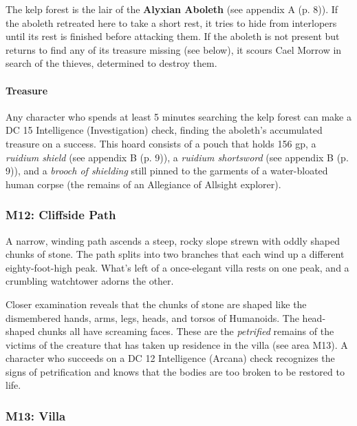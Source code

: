 \documentclass[a4paper, 11pt, bg=full, twocolumn, nooutline]{dndbook}
\begin{document}
The kelp forest is the lair of the \textbf{Alyxian Aboleth} (see appendix A (p. 8)). If the aboleth retreated here to take a short rest, it tries to hide from interlopers until its rest is finished before attacking them. If the aboleth is not present but returns to find any of its treasure missing (see below), it scours Cael Morrow in search of the thieves, determined to destroy them.

\paragraph{Treasure}

Any character who spends at least 5 minutes searching the kelp forest can make a DC 15 Intelligence (Investigation) check, finding the aboleth's accumulated treasure on a success. This hoard consists of a pouch that holds 156 gp, a \textit{ruidium shield} (see appendix B (p. 9)), a \textit{ruidium shortsword} (see appendix B (p. 9)), and a \textit{brooch of shielding} still pinned to the garments of a water-bloated human corpse (the remains of an Allegiance of Allsight explorer).


\subsubsection{M12: Cliffside Path}

\begin{DndReadAloud}
A narrow, winding path ascends a steep, rocky slope strewn with oddly shaped chunks of stone. The path splits into two branches that each wind up a different eighty-foot-high peak. What's left of a once-elegant villa rests on one peak, and a crumbling watchtower adorns the other.
\end{DndReadAloud}

Closer examination reveals that the chunks of stone are shaped like the dismembered hands, arms, legs, heads, and torsos of Humanoids. The head-shaped chunks all have screaming faces. These are the \textit{petrified} remains of the victims of the creature that has taken up residence in the villa (see area M13). A character who succeeds on a DC 12 Intelligence (Arcana) check recognizes the signs of petrification and knows that the bodies are too broken to be restored to life.

\subsubsection{M13: Villa}
\end{document}
